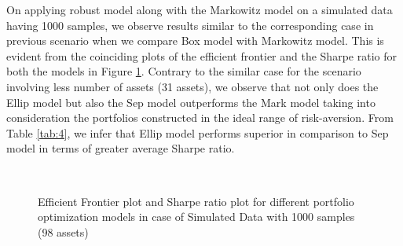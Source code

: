On applying robust model along with the Markowitz model on a simulated data having 1000 samples, we observe results similar to the corresponding case in previous scenario when we compare Box model with Markowitz model. This is evident from the coinciding plots of the efficient frontier and the Sharpe ratio for both the models in Figure \ref{fig:4}. Contrary to the similar case for the scenario involving less number of assets (31 assets), we observe that not only does the Ellip model but also the Sep model outperforms the Mark model taking into consideration the portfolios constructed in the ideal range of risk-aversion. From Table \ref{tab:4}, we infer that Ellip model performs superior in comparison to Sep model in terms of greater average Sharpe ratio.
\begin{figure}[!h]
    
    
     \hfill
   \\
   \caption{Efficient Frontier plot and Sharpe ratio plot for different portfolio optimization models in case of Simulated Data with 1000 samples (98 assets)}
   \label{fig:4}
\end{figure}

